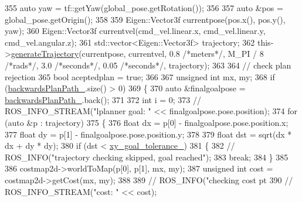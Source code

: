 \begin{DoxyCode}
{355     \textcolor{keyword}{auto} yaw = tf::getYaw(global\_pose.getRotation());
356 
357     \textcolor{keyword}{auto} &pos = global\_pose.getOrigin();
358 
359     Eigen::Vector3f currentpose(pos.x(), pos.y(), yaw);
360     Eigen::Vector3f currentvel(cmd\_vel.linear.x, cmd\_vel.linear.y, cmd\_vel.angular.z);
361     std::vector<Eigen::Vector3f> trajectory;
362     this->\hyperlink{classmove__base__z__client_1_1backward__local__planner_1_1BackwardLocalPlanner_a5da53f29e43639a9af5ba3b640e6bf8c}{generateTrajectory}(currentpose, currentvel, 0.8 \textcolor{comment}{/*meters*/}, M\_PI / 8 \textcolor{comment}{/*rads*/}, 
      3.0 \textcolor{comment}{/*seconds*/}, 0.05 \textcolor{comment}{/*seconds*/}, trajectory);
363 
364     \textcolor{comment}{// check plan rejection}
365     \textcolor{keywordtype}{bool} aceptedplan = \textcolor{keyword}{true};
366 
367     \textcolor{keywordtype}{unsigned} \textcolor{keywordtype}{int} mx, my;
368     \textcolor{keywordflow}{if} (\hyperlink{classmove__base__z__client_1_1backward__local__planner_1_1BackwardLocalPlanner_a451add2af7d6d83a7415277311b3ed04}{backwardsPlanPath\_}.size() > 0)
369     \{
370         \textcolor{keyword}{auto} &finalgoalpose = \hyperlink{classmove__base__z__client_1_1backward__local__planner_1_1BackwardLocalPlanner_a451add2af7d6d83a7415277311b3ed04}{backwardsPlanPath\_}.back();
371 
372         \textcolor{keywordtype}{int} i = 0;
373         \textcolor{comment}{// ROS\_INFO\_STREAM("lplanner goal: " << finalgoalpose.pose.position);}
374         \textcolor{keywordflow}{for} (\textcolor{keyword}{auto} &p : trajectory)
375         \{
376             \textcolor{keywordtype}{float} dx = p[0] - finalgoalpose.pose.position.x;
377             \textcolor{keywordtype}{float} dy = p[1] - finalgoalpose.pose.position.y;
378 
379             \textcolor{keywordtype}{float} dst = sqrt(dx * dx + dy * dy);
380             \textcolor{keywordflow}{if} (dst < \hyperlink{classmove__base__z__client_1_1backward__local__planner_1_1BackwardLocalPlanner_a89ab1ee7283a474dc19970789f51c087}{xy\_goal\_tolerance\_})
381             \{
382                 \textcolor{comment}{//  ROS\_INFO("trajectory checking skipped, goal reached");}
383                 \textcolor{keywordflow}{break};
384             \}
385 
386             costmap2d->worldToMap(p[0], p[1], mx, my);
387             \textcolor{keywordtype}{unsigned} \textcolor{keywordtype}{int} cost = costmap2d->getCost(mx, my);
388 
389             \textcolor{comment}{// ROS\_INFO("checking cost pt %
390             \textcolor{comment}{// ROS\_INFO\_STREAM("cost: " << cost);}
}}
\end{DoxyCode}
